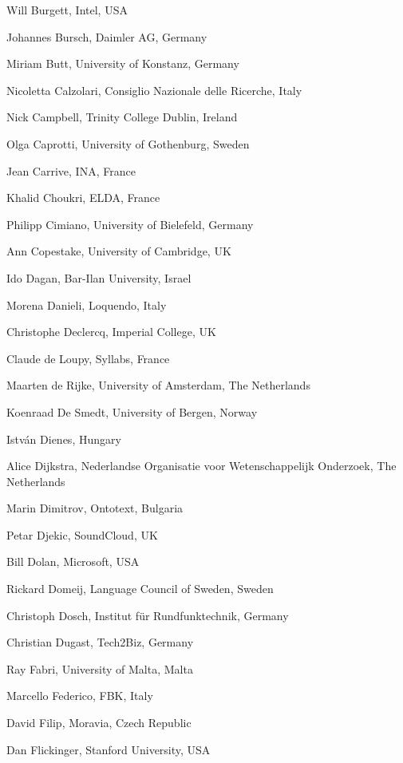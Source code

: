 \documentclass[10pt, plain]{../../metanetpaper}
\begin{document}
\begin{multicols}{3}
\begin{small}
\begin{enumerate}
{      \item Will Burgett, Intel, USA
      \item Johannes Bursch, Daimler AG, Germany
      \item Miriam Butt, University of Konstanz, Germany
      \item Nicoletta Calzolari, Consiglio Nazionale delle Ricerche, Italy
      \item Nick Campbell, Trinity College Dublin, Ireland
      \item Olga Caprotti, University of Gothenburg, Sweden
      \item Jean Carrive, INA, France
      \item Khalid Choukri, ELDA, France
      \item Philipp Cimiano, University of Bielefeld, Germany
      \item Ann Copestake, University of Cambridge, UK
      \item Ido Dagan, Bar-Ilan University, Israel
      \item Morena Danieli, Loquendo, Italy
      \item Christophe Declercq, Imperial College, UK
      \item Claude de Loupy, Syllabs, France
      \item Maarten de Rijke, University of Amsterdam, The Netherlands
      \item Koenraad De Smedt, University of Bergen, Norway
      \item István Dienes, Hungary
      \item Alice Dijkstra, Nederlandse Organisatie voor Wetenschappelijk Onderzoek, The Netherlands
      \item Marin Dimitrov, Ontotext, Bulgaria
      \item Petar Djekic, SoundCloud, UK
      \item Bill Dolan, Microsoft, USA
      \item Rickard Domeij, Language Council of Sweden, Sweden
      \item Christoph Dosch, Institut für Rundfunktechnik, Germany
      \item Christian Dugast, Tech2Biz, Germany
      \item Ray Fabri, University of Malta, Malta
      \item Marcello Federico, FBK, Italy
      \item David Filip, Moravia, Czech Republic
      \item Dan Flickinger, Stanford University, USA
}
\end{enumerate}
\end{small}
\end{multicols}
\end{document}
